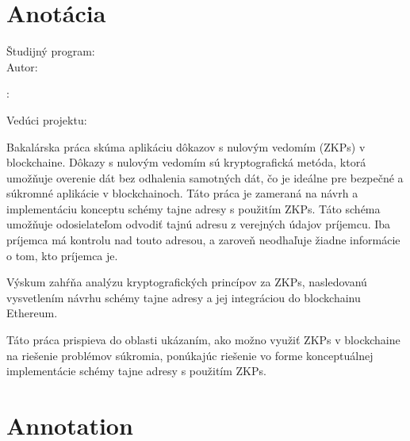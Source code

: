 \thispagestyle{empty}

\vspace*{\fill}

\section*{Anotácia}

\begin{minipage}[t]{1\columnwidth}
    \FIITuniversitySK

    \FIITfacultySK

    Študijný program: \FIITstudyProgramSK\\

    Autor: \FIITauthor

    \FIITthesisSK: \FIITtitleSK

    Vedúci projektu: \FIITsupervisor

    \FIITdateSK
\end{minipage}

\bigskip{}

Bakalárska práca skúma aplikáciu dôkazov s nulovým vedomím (ZKPs) v
blockchaine. Dôkazy s nulovým vedomím sú kryptografická metóda, ktorá
umožňuje overenie dát bez odhalenia samotných dát, čo je ideálne pre bezpečné
a súkromné aplikácie v blockchainoch. Táto práca je zameraná na návrh
a implementáciu konceptu schémy tajne adresy s použitím ZKPs. Táto schéma
umožňuje odosielateľom odvodiť tajnú adresu z verejných údajov príjemcu.
Iba príjemca má kontrolu nad touto adresou, a zaroveň neodhaľuje žiadne informácie
o tom, kto príjemca je.

Výskum zahŕňa analýzu kryptografických princípov za ZKPs, nasledovanú
vysvetlením návrhu schémy tajne adresy a jej integráciou do blockchainu Ethereum.

Táto práca prispieva do oblasti ukázaním, ako možno využiť ZKPs v blockchaine
na riešenie problémov súkromia, ponúkajúc riešenie vo forme konceptuálnej
implementácie schémy tajne adresy s použitím ZKPs.

\newpage{}\thispagestyle{empty}\medskip{}

\emptypage

\thispagestyle{empty}

\vspace*{\fill}

\section*{Annotation}

